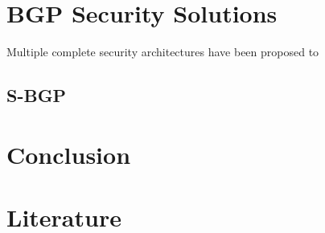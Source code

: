 \documentclass[]{IEEEtran}
\begin{document}
	
	
			
				

	\section{BGP Security Solutions}
	Multiple complete security architectures have been proposed to 
	\subsection{S-BGP}
				
	\section{Conclusion}				

	
	\section{Literature}
\end{document}
